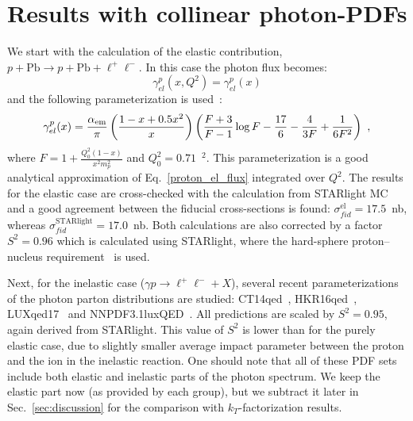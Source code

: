 \section{Results with collinear photon-PDFs}

We start with the calculation of the elastic contribution, $p+\textrm{Pb}\rightarrow p+\textrm{Pb}+ \ell^+\ell^-$.
In this case the photon flux becomes:
\begin{equation}
\gamma^{p}_{el}(x, Q^2) = \gamma^{p}_{el}(x) 
\end{equation}
and the following parameterization is used~\cite{Budnev:1974de}:
\begin{equation} \label{eq:elasticRenat}
\gamma^{p}_{el}(x)  = \frac{\alpha_{\rm em}}{\pi}
\left(
\frac{1-x+0.5x^2}{x}
\right)
\left(
\frac{F+3}{F-1}\log{F}-\frac{17}{6}-\frac{4}{3F}+\frac{1}{6F^2}
\right)~,
\end{equation}
where $F = 1+\frac{Q_0^2(1-x)}{x^2 m_p^2}$ and $Q_0^2 = 0.71$~\GeV$^2$. This parameterization is a good analytical approximation of Eq.~\ref{proton_el_flux} integrated over $Q^2$.
The results for the elastic case are cross-checked with the calculation from STARlight MC and a good agreement between the fiducial cross-sections is found:
$\sigma_{fid}^{\textrm{el}} = 17.5$~nb, whereas $\sigma_{fid}^{\textrm{STARlight}} = 17.0$~nb.
Both calculations are also corrected by a factor $S^2=0.96$ which 
is calculated using STARlight, where the hard-sphere proton--nucleus requirement~\cite{Klein:2016yzr} is used.

Next, for the inelastic case ($\gamma p\rightarrow \ell^+\ell^- + X$), several recent parameterizations of the photon parton distributions are studied: CT14qed~\cite{Schmidt:2015zda}, HKR16qed~\cite{Harland-Lang:2016kog}, LUXqed17~\cite{Manohar:2017eqh} and NNPDF3.1luxQED~\cite{Bertone:2017bme}. 
All predictions are scaled by $S^2=0.95$, again derived from STARlight. This value of $S^2$ is lower than for the purely elastic case, due to slightly smaller average impact parameter between the proton and the ion in the inelastic reaction.
One should note that all of these PDF sets include both elastic and inelastic parts of the photon spectrum.
We keep the elastic part now (as provided by each group), but we subtract it later in Sec.~\ref{sec:discussion} for the comparison with $k_T$-factorization results.

